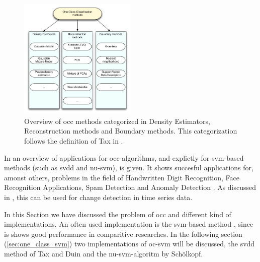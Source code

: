 \begin{figure}
  \centering
    \includegraphics[width=0.5\textwidth,keepaspectratio]{./Figures/chapter3/occ_methods.pdf}
  \caption[\gls{occ} methods]{Overview of \gls{occ} methods categorized in Density Estimators, Reconstruction methods and Boundary methods. This categorization follows the definition of Tax in \cite{tax2001one}.}
  \label{fig:occ-methods}
\end{figure}

In \cite{khan2010survey,noumir2012simple} an overview of applications for \gls{occ}-algorithms, and explictly for \gls{svm}-based methods (such as \gls{svdd} and \gls{nu-svm}), is given.
It shows succesful applications for, amonst others, problems in the field of Handwritten Digit Recognition, Face Recognition Applications, Spam Detection and Anomaly Detection \cite{li2003improving,perdisci2006using}.
As discussed in , this can be used for change detection in time series data.

In this Section we have discussed the problem of \gls{occ} and different kind of implementations.
An often used implementation is the \gls{svm}-based method \cite{noumir2012simple}, since is shows good performance in comparitive researches.
In the following section (\ref{sec:one_class_svm}) two implementations of \gls{oc-svm} will be discussed, the \gls{svdd} method of Tax and Duin \cite{tax1999support} and the \gls{nu-svm}-algoritm by Sch\"olkopf.






